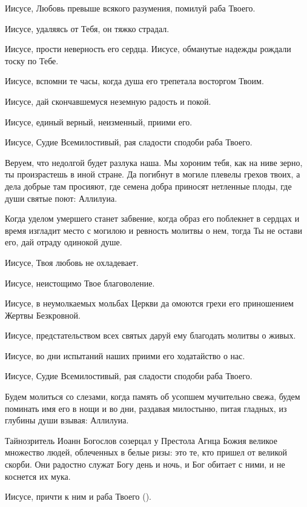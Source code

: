 \begin{mymulticols}
Иисусе, Любовь превыше всякого разумения, помилуй раба Твоего. 

Иисусе, удаляясь от Тебя, он тяжко страдал. 

Иисусе, прости неверность его сердца. Иисусе, обманутые надежды рождали тоску по Тебе. 

Иисусе, вспомни те часы, когда душа его трепетала восторгом Твоим. 

Иисусе, дай скончавшемуся неземную радость и покой. 

Иисусе, единый верный, неизменный, приими его. 

Иисусе, Судие Всемилостивый, рая сладости сподоби раба Твоего.


Веруем, что недолгой будет разлука наша. Мы хороним тебя, как на ниве зерно, ты произрастешь в иной стране. Да погибнут в могиле плевелы грехов твоих, а дела добрые там просияют, где семена добра приносят нетленные плоды, где души святые поют: Аллилуиа.


Когда уделом умершего станет забвение, когда образ его поблекнет в сердцах и время изгладит место с могилою и ревность молитвы о нем, тогда Ты не остави его, дай отраду одинокой душе. 

Иисусе, Твоя любовь не охладевает. 

Иисусе, неистощимо Твое благоволение. 

Иисусе, в неумолкаемых мольбах Церкви да омоются грехи его приношением Жертвы Безкровной. 

Иисусе, предстательством всех святых даруй ему благодать молитвы о живых. 

Иисусе, во дни испытаний наших приими его ходатайство о нас. 

Иисусе, Судие Всемилостивый, рая сладости сподоби раба Твоего.


Будем молиться со слезами, когда память об усопшем мучительно свежа, будем поминать имя его в нощи и во дни, раздавая милостыню, питая гладных, из глубины души взывая: Аллилуиа.


Тайнозритель Иоанн Богослов созерцал у Престола Агнца Божия великое множество людей, облеченных в белые ризы: это те, кто пришел от великой скорби. Они радостно служат Богу день и ночь, и Бог обитает с ними, и не коснется их мука. 

Иисусе, причти к ним и раба Твоего (). 


\end{mymulticols}
